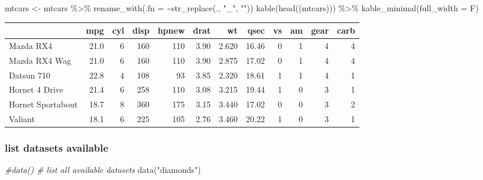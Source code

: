 \documentclass[
]{article}
\newenvironment{Shaded}{\begin{snugshade}}{\end{snugshade}}
\newcommand{\AttributeTok}[1]{\textcolor[rgb]{0.77,0.63,0.00}{#1}}
\newcommand{\CommentTok}[1]{\textcolor[rgb]{0.56,0.35,0.01}{\textit{#1}}}
\newcommand{\FunctionTok}[1]{\textcolor[rgb]{0.00,0.00,0.00}{#1}}
\newcommand{\NormalTok}[1]{#1}
\newcommand{\OtherTok}[1]{\textcolor[rgb]{0.56,0.35,0.01}{#1}}
\newcommand{\SpecialCharTok}[1]{\textcolor[rgb]{0.00,0.00,0.00}{#1}}
\newcommand{\StringTok}[1]{\textcolor[rgb]{0.31,0.60,0.02}{#1}}
\begin{document}
\begin{Shaded}
\begin{Highlighting}[]
\NormalTok{mtcars }\OtherTok{\textless{}{-}}\NormalTok{ mtcars }\SpecialCharTok{\%\textgreater{}\%} \FunctionTok{rename\_with}\NormalTok{(}\AttributeTok{.fn =} \SpecialCharTok{\textasciitilde{}}\FunctionTok{str\_replace}\NormalTok{(., }\StringTok{"\_"}\NormalTok{, }\StringTok{""}\NormalTok{))}
\FunctionTok{kable}\NormalTok{(}\FunctionTok{head}\NormalTok{((mtcars))) }\SpecialCharTok{\%\textgreater{}\%} \FunctionTok{kable\_minimal}\NormalTok{(}\AttributeTok{full\_width =}\NormalTok{ F)}
\end{Highlighting}
\end{Shaded}

\begin{table}
\centering
\begin{tabular}{l|r|r|r|r|r|r|r|r|r|r|r}
\hline
  & mpg & cyl & disp & hpnew & drat & wt & qsec & vs & am & gear & carb\\
\hline
Mazda RX4 & 21.0 & 6 & 160 & 110 & 3.90 & 2.620 & 16.46 & 0 & 1 & 4 & 4\\
\hline
Mazda RX4 Wag & 21.0 & 6 & 160 & 110 & 3.90 & 2.875 & 17.02 & 0 & 1 & 4 & 4\\
\hline
Datsun 710 & 22.8 & 4 & 108 & 93 & 3.85 & 2.320 & 18.61 & 1 & 1 & 4 & 1\\
\hline
Hornet 4 Drive & 21.4 & 6 & 258 & 110 & 3.08 & 3.215 & 19.44 & 1 & 0 & 3 & 1\\
\hline
Hornet Sportabout & 18.7 & 8 & 360 & 175 & 3.15 & 3.440 & 17.02 & 0 & 0 & 3 & 2\\
\hline
Valiant & 18.1 & 6 & 225 & 105 & 2.76 & 3.460 & 20.22 & 1 & 0 & 3 & 1\\
\hline
\end{tabular}
\end{table}

\hypertarget{list-datasets-available}{%
\subsubsection{list datasets available}\label{list-datasets-available}}

\begin{Shaded}
\begin{Highlighting}[]
\CommentTok{\#data() \# list all available datasets}
\FunctionTok{data}\NormalTok{(}\StringTok{"diamonds"}\NormalTok{)}
\end{Highlighting}
\end{Shaded}
\end{document}
